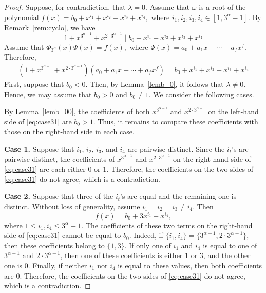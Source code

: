 \documentclass[12pt]{article}
\begin{document}
\begin{proof}
	Suppose, for contradiction, that $\lambda = 0$. Assume that $\omega$ is a root of the polynomial
	$
	f(x)=b_0+x^{i_1}+x^{i_2}+x^{i_3}+x^{i_4},
	$
	where $i_1,i_2,i_3,i_4\in[1,3^\alpha-1]$. By Remark~\ref{rem:cyclo}, we have
	\[
	1+x^{3^{\alpha-1}}+x^{2\cdot3^{\alpha-1}}
	\mid
	b_0+x^{i_1}+x^{i_2}+x^{i_3}+x^{i_4}
	\]
	Assume that
	$
	\Phi_{3^\alpha}(x)\Psi(x)	=f(x),
	$
	where
	$
	\Psi(x)=a_0+a_1x+\cdots+a_fx^f.
	$
	Therefore,
	\begin{equation}\label{eq:case31}
		\begin{aligned}
			\left(1+x^{3^{\alpha-1}}+x^{2\cdot3^{\alpha-1}}\right)
			\left(a_0+a_1x+\cdots+a_fx^f\right)
			=b_0+x^{i_1}+x^{i_2}+x^{i_3}+x^{i_4}
		\end{aligned}
	\end{equation}
First, suppose that $b_0<0$. Then, by Lemma~\ref{lemb_0}, it follows that $\lambda\neq0$. Hence, we may assume that $b_0>0$ and $b_0\neq1$. We consider the following cases.

By Lemma~\ref{lemb_00}, the coefficients of both $x^{3^{\alpha-1}}$ and $x^{2\cdot3^{\alpha-1}}$ on the left-hand side of \eqref{eq:case31} are $b_0>1$. Thus, it remains to compare these coefficients with those on the right-hand side in each case.

\medskip

\textbf{Case 1.} Suppose that $i_1$, $i_2$, $i_3$, and $i_4$ are pairwise distinct. Since the $i_t$'s are pairwise distinct, the coefficients of $x^{3^{\alpha-1}}$ and $x^{2\cdot3^{\alpha-1}}$ on the right-hand side of \eqref{eq:case31} are each either $0$ or $1$. Therefore, the coefficients on the two sides of \eqref{eq:case31} do not agree, which is a contradiction.

\medskip

\textbf{Case 2.} Suppose that three of the $i_t$'s are equal and the remaining one is distinct. Without loss of generality, assume $i_1=i_2=i_3\neq i_4$. Then
\[
f(x)=b_0+3x^{i_1}+x^{i_4},
\]
where $1\le i_1,i_4\le 3^\alpha-1$. The coefficients of these two terms on the right-hand side of \eqref{eq:case31} cannot be equal to $b_0$. Indeed, if $\{i_1,i_4\}=\{3^{\alpha-1},2\cdot3^{\alpha-1}\}$, then these coefficients belong to $\{1,3\}$. If only one of $i_1$ and $i_4$ is equal to one of $3^{\alpha-1}$ and $2\cdot3^{\alpha-1}$, then one of these coefficients is either $1$ or $3$, and the other one is $0$. Finally, if neither $i_1$ nor $i_4$ is equal to these values, then both coefficients are $0$. Therefore, the coefficients on the two sides of \eqref{eq:case31} do not agree, which is a contradiction.


\end{proof}
\end{document}
